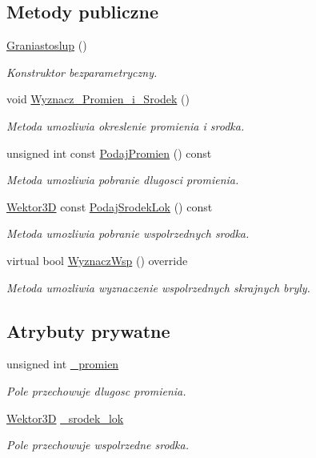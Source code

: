 \subsection*{Metody publiczne}
\begin{DoxyCompactItemize}
\item 
\hyperlink{classGraniastoslup_a1bc529dd6c0e18a1ae30ac5f7a0836e3}{Graniastoslup} ()
\begin{DoxyCompactList}\small\item\em Konstruktor bezparametryczny. \end{DoxyCompactList}\item 
void \hyperlink{classGraniastoslup_a348b25e965350ea5c8e5ebee39b35357}{Wyznacz\+\_\+\+Promien\+\_\+i\+\_\+\+Srodek} ()
\begin{DoxyCompactList}\small\item\em Metoda umozliwia okreslenie promienia i srodka. \end{DoxyCompactList}\item 
unsigned int const \hyperlink{classGraniastoslup_a7c5e6bb0c1761358af0e6ee80a8ab600}{Podaj\+Promien} () const
\begin{DoxyCompactList}\small\item\em Metoda umozliwia pobranie dlugosci promienia. \end{DoxyCompactList}\item 
\hyperlink{classSWektor}{Wektor3D} const \hyperlink{classGraniastoslup_aa573569ea9ca59cc99024c8e2a3d4308}{Podaj\+Srodek\+Lok} () const
\begin{DoxyCompactList}\small\item\em Metoda umozliwia pobranie wspolrzednych srodka. \end{DoxyCompactList}\item 
virtual bool \hyperlink{classGraniastoslup_a786313962b174b9c25084e45e827f39b}{Wyznacz\+Wsp} () override
\begin{DoxyCompactList}\small\item\em Metoda umozliwia wyznaczenie wspolrzednych skrajnych bryly. \end{DoxyCompactList}\end{DoxyCompactItemize}
\subsection*{Atrybuty prywatne}
\begin{DoxyCompactItemize}
\item 
unsigned int \hyperlink{classGraniastoslup_abaa6352f927e7317a0c02ec27b9a08a0}{\+\_\+promien}
\begin{DoxyCompactList}\small\item\em Pole przechowuje dlugosc promienia. \end{DoxyCompactList}\item 
\hyperlink{classSWektor}{Wektor3D} \hyperlink{classGraniastoslup_a8121bb2dc600bcbe9e852b3776f7df6f}{\+\_\+srodek\+\_\+lok}
\begin{DoxyCompactList}\small\item\em Pole przechowuje wspolrzedne srodka. \end{DoxyCompactList}\end{DoxyCompactItemize}


